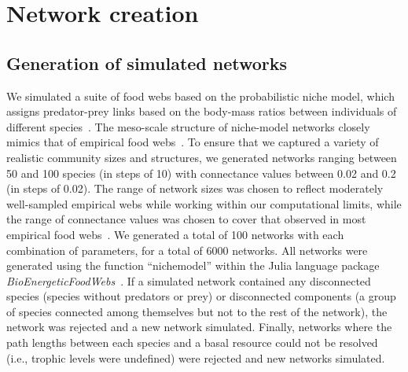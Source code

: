 \documentclass[12pt]{article}
\begin{document}
\begin{spacing}{2.0}
{\begin{spacing}{1.0}
\begin{enumerate}
    \end{enumerate}    
\end{spacing}
}
\clearpage

\linenumbers
\section{Network creation}

    \subsection{Generation of simulated networks}

        We simulated a suite of food webs based on the probabilistic niche model, which assigns predator-prey links based on the body-mass ratios between individuals of different species~\citep{Williams2000,Delmas2017}. 
        The meso-scale structure of niche-model networks closely mimics that of empirical food webs~\citep{Stouffer2007}. 
        To ensure that we captured a variety of realistic community sizes and structures, we generated networks ranging between 50 and 100 species (in steps of 10) with connectance values between 0.02 and 0.2 (in steps of 0.02). 
        The range of network sizes was chosen to reflect moderately well-sampled empirical webs while working within our computational limits, while the range of connectance values was chosen to cover that observed in most empirical food webs~\citep{Dunne2002e}.
        We generated a total of 100 networks with each combination of parameters, for a total of 6000 networks. 
        All networks were generated using the function ``nichemodel'' within the Julia language package \emph{BioEnergeticFoodWebs}~\citep{bioenergeticfw,Delmas2017}. 
        If a simulated network contained any disconnected species (species without predators or prey) or disconnected components (a group of species connected among themselves but not to the rest of the network), the network was rejected and a new network simulated.
        Finally, networks where the path lengths between each species and a basal resource could not be resolved (i.e., trophic levels were undefined) were rejected and new networks simulated.



\end{spacing}
\end{document}
